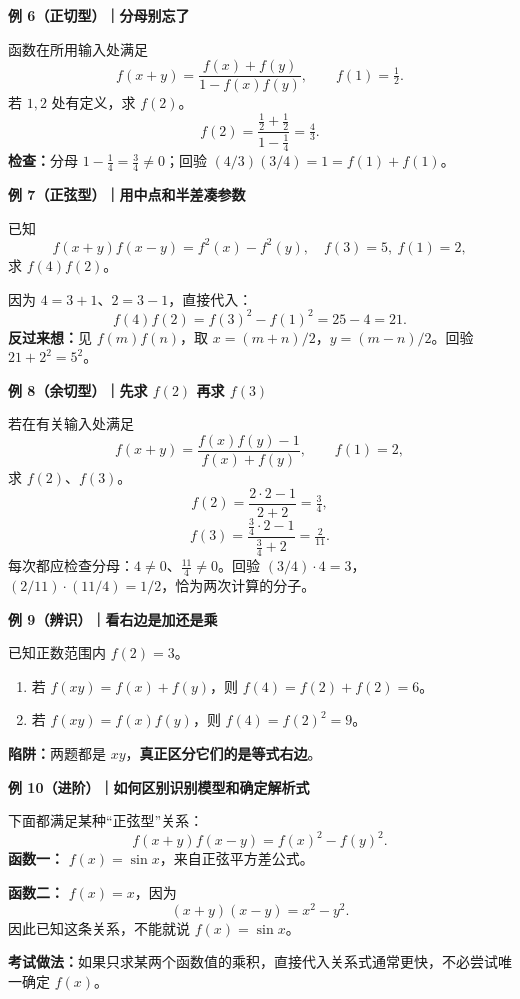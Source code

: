 \FReserve{4cm}
\begin{examplebox}
\textbf{\textcolor{CExample}{例 6（正切型）｜分母别忘了}}

函数在所用输入处满足
\[f(x+y)=\frac{f(x)+f(y)}{1-f(x)f(y)},\qquad f(1)=\tfrac12.\]
若 $1,2$ 处有定义，求 $f(2)$。
\[
f(2)=\frac{\tfrac12+\tfrac12}{1-\tfrac14}=\boxed{\tfrac43}.
\]
\textbf{检查：}分母 $1-\tfrac14=\tfrac34\ne0$；回验 $(4/3)(3/4)=1=f(1)+f(1)$。
\end{examplebox}

\FReserve{4cm}
\begin{examplebox}
\textbf{\textcolor{CExample}{例 7（正弦型）｜用中点和半差凑参数}}

已知
\[f(x+y)f(x-y)=f^2(x)-f^2(y),\quad f(3)=5,\ f(1)=2,\]
求 $f(4)f(2)$。

因为 $4=3+1$、$2=3-1$，直接代入：
\[
f(4)f(2)=f(3)^2-f(1)^2=25-4=\boxed{21}.
\]
\textbf{反过来想：}见 $f(m)f(n)$，取 $x=(m+n)/2$，$y=(m-n)/2$。回验 $21+2^2=5^2$。

\end{examplebox}

\FReserve{4cm}
\begin{examplebox}
\textbf{\textcolor{CExample}{例 8（余切型）｜先求 $f(2)$ 再求 $f(3)$}}

若在有关输入处满足
\[f(x+y)=\frac{f(x)f(y)-1}{f(x)+f(y)},\qquad f(1)=2,\]
求 $f(2)$、$f(3)$。
\[
f(2)=\frac{2\cdot2-1}{2+2}=\boxed{\tfrac34},
\]
\[
f(3)=\frac{\tfrac34\cdot2-1}{\tfrac34+2}=\boxed{\tfrac2{11}}.
\]
每次都应检查分母：$4\ne0$、$\frac{11}{4}\ne0$。回验 $(3/4)\cdot4=3$，$(2/11)\cdot(11/4)=1/2$，恰为两次计算的分子。
\end{examplebox}

\FReserve{4cm}
\begin{examplebox}
\textbf{\textcolor{CExample}{例 9（辨识）｜看右边是加还是乘}}

已知正数范围内 $f(2)=3$。
\begin{enumerate}[leftmargin=*,itemsep=.5em]
\item 若 $f(xy)=f(x)+f(y)$，则 $f(4)=f(2)+f(2)=\boxed{6}$。
\item 若 $f(xy)=f(x)f(y)$，则 $f(4)=f(2)^2=\boxed{9}$。
\end{enumerate}
\textbf{陷阱：}两题都是 $xy$，\textbf{真正区分它们的是等式右边}。

\end{examplebox}

\FReserve{4cm}
\begin{examplebox}
\textbf{\textcolor{CExample}{例 10（进阶）｜如何区别识别模型和确定解析式}}

下面都满足某种“正弦型”关系：
\[
f(x+y)f(x-y)=f(x)^2-f(y)^2.
\]
\textbf{函数一：} $f(x)=\sin x$，来自正弦平方差公式。

\textbf{函数二：} $f(x)=x$，因为
\[(x+y)(x-y)=x^2-y^2.\]
因此已知这条关系，不能就说 $f(x)=\sin x$。

\textbf{考试做法：}如果只求某两个函数值的乘积，直接代入关系式通常更快，不必尝试唯一确定 $f(x)$。
\end{examplebox}


